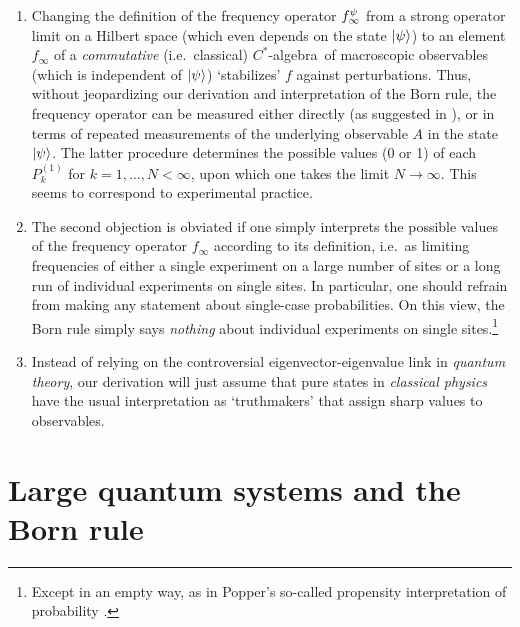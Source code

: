 \documentclass[12pt]{article}
\newcommand{\ca}{$C^*$-algebra} \newcommand{\jba}{JB-algebra}
\newcommand{\raw}{\rightarrow} \newcommand{\rat}{\mapsto}
\begin{document}
 \begin{enumerate}
\item Changing the definition of the frequency operator $f_{\infty}^{\psi}$  from a strong operator limit 
on a Hilbert space (which even depends on the state $|\psi\rangle$) to an element $f_{\infty}$ of a 
\emph{commutative} (i.e.\ classical) \ca\  of macroscopic observables (which is independent of  $|\psi\rangle$) `stabilizes' $f$ against perturbations. Thus, without jeopardizing our derivation and interpretation of the Born rule, the  frequency operator can be measured either directly (as suggested in \cite{14}), or in terms of repeated measurements of the underlying observable $A$ in the state $|\psi\rangle$. The latter procedure 
 determines the possible values (0 or 1) of each $P_k^{(1)}$ for $k=1,\ldots, N<\infty$, upon which one takes the limit $N\raw\infty$. This seems to correspond to experimental practice.
\item The second objection is obviated if one simply interprets the possible values of the frequency operator $f_{\infty}$ according to  its definition,  i.e.\ as limiting frequencies of either a single experiment on a large number of sites or 
a long run of individual experiments on single sites. In particular, one should refrain from making any statement about single-case probabilities.
On this view, the Born rule simply says \emph{nothing} about individual experiments on single sites.\footnote{Except in an empty way, as in Popper's so-called propensity interpretation of probability \cite{17,mellor}.}
\item  Instead of relying on the controversial eigenvector-eigenvalue link in \emph{quantum theory}, our derivation will just assume that pure states in \emph{classical physics} have the usual interpretation as  `truthmakers' that assign sharp values to observables.
\end{enumerate}
\section{Large quantum systems and the Born rule}\label{sec3}
\end{document}
